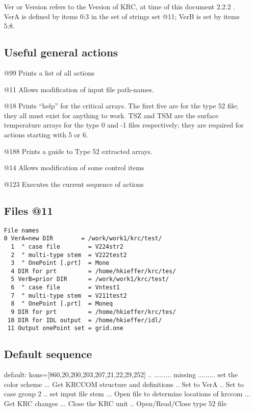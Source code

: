 \documentclass{article}  %
\begin{document}
Ver or Version refers to the Version of KRC, at time of this document 2.2.2 .
 VerA is defined by items 0:3 in the set of strings set @11; VerB is set by items 5:8.


\subsection{ Useful general actions}

@99 Prints a list of all actions

@11 Allows modification of input file path-names.

@18 Prints ``help''  for the critical arrays. The first five are for the type 52 file; they all must exist for anything to work.  TSZ and TSM are the surface temperature arrays for the type 0 and -1 files respectively; they are required for actions starting with 5 or 6.

@188 Prints a guide to Type 52 extracted arrays.

@14  Allows modification of some control items

@123 Executes the current sequence of actions 

\subsection{Files  @11} %
\vspace{-3.mm} 
\begin{verbatim}
File names  
0 VerA=new DIR        = /work/work1/krc/test/
  1  " case file        = V224str2
  2  " multi-type stem  = V222test2
  3  " OnePoint [.prt]  = Mone
  4 DIR for prt         = /home/hkieffer/krc/tes/
  5 VerB=prior DIR      = /work/work1/krc/test/
  6  " case file        = Vntest1
  7  " multi-type stem  = V211test2
  8  " OnePoint [.prt]  = Moneq
  9 DIR for prt         = /home/hkieffer/krc/tes/
 10 DIR for IDL output  = /home/hkieffer/idl/
 11 Output onePoint set = grid.one

\end{verbatim}
\subsection{Default sequence} %
default: kons=[860,20,200,203,207,21,22,29,252]
\qi {}.. ......... missing ......... set the color scheme
\qi {}... Get KRCCOM structure and definitions
\qi {}.. Set to VerA 
\qi {}.. Set to case group 2
\qi {}.. set input file stem
\qi {}... Open file to determine locations of krccom
\qi {}... Get KRC changes
\qi {}... Close the KRC unit
\qi {}.. Open/Read/Close type 52 file
\end{document}
